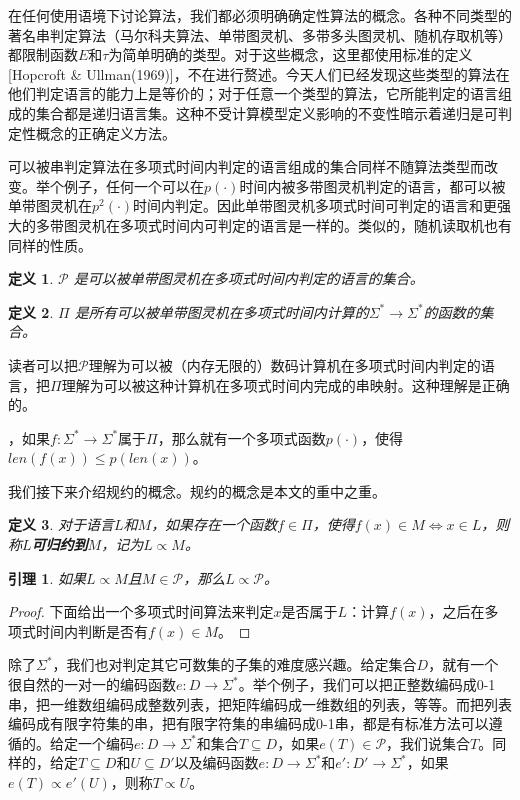\documentclass[twocolumn]{article}
\newtheorem{definition}{\hspace{2em}定义}
\newtheorem{lemma}{\hspace{2em}引理}
\theoremstyle{nonumberplain}%
\newtheorem{proof}{\hspace{2em}证明}
\begin{document}
\begin{CJK}{UTF8}{gbsn}
    在任何使用语境下讨论算法，我们都必须明确确定性算法的概念。各种不同类型的著名串判定算法（马尔科夫算法、单带图灵机、多带多头图灵机、随机存取机等）都限制函数$E$和$\tau$为简单明确的类型。对于这些概念，这里都使用标准的定义[Hopcroft \& Ullman(1969)]，不在进行赘述。今天人们已经发现这些类型的算法在他们判定语言的能力上是等价的；对于任意一个类型的算法，它所能判定的语言组成的集合都是递归语言集。这种不受计算模型定义影响的不变性暗示着递归是可判定性概念的正确定义方法。

    可以被串判定算法在多项式时间内判定的语言组成的集合同样不随算法类型而改变。举个例子，任何一个可以在$p(\cdot)$时间内被多带图灵机判定的语言，都可以被单带图灵机在$p^2(\cdot)$时间内判定。因此单带图灵机多项式时间可判定的语言和更强大的多带图灵机在多项式时间内可判定的语言是一样的。类似的，随机读取机也有同样的性质。
    \begin{definition}
        $\mathcal{P}$ 是可以被单带图灵机在多项式时间内判定的语言的集合。
    \end{definition}
    \begin{definition}
        $\Pi$ 是所有可以被单带图灵机在多项式时间内计算的$\Sigma^*\to\Sigma^*$的函数的集合。
    \end{definition}

    读者可以把$\mathcal{P}$理解为可以被（内存无限的）数码计算机在多项式时间内判定的语言，把$\Pi$理解为可以被这种计算机在多项式时间内完成的串映射。这种理解是正确的。

    {}，如果$f:\Sigma^*\to\Sigma^*$属于$\Pi$，那么就有一个多项式函数$p(\cdot)$，使得$len(f(x))\le p(len(x))$。

    我们接下来介绍规约的概念。规约的概念是本文的重中之重。
    \begin{definition}
        对于语言$L$和$M$，如果存在一个函数$f\in\Pi$，使得$f(x)\in M \Leftrightarrow x\in L$，则称$L${\bf 可归约到}$M$，记为$L\propto M$。
    \end{definition}

    \begin{lemma}
        如果$L\propto M$且$M \in \mathcal{P}$，那么$L\propto\mathcal{P}$。
    \end{lemma}
    \begin{proof}
        下面给出一个多项式时间算法来判定$x$是否属于$L$：计算$f(x)$，之后在多项式时间内判断是否有$f(x)\in M$。
    \end{proof}

    除了$\Sigma^*$，我们也对判定其它可数集的子集的难度感兴趣。给定集合$D$，就有一个很自然的一对一的编码函数$e:D\to\Sigma^*$。举个例子，我们可以把正整数编码成0-1串，把一维数组编码成整数列表，把矩阵编码成一维数组的列表，等等。而把列表编码成有限字符集的串，把有限字符集的串编码成0-1串，都是有标准方法可以遵循的。给定一个编码$e:D\to\Sigma^*$和集合$T\subseteq D$，如果$e(T)\in\mathcal{P}$，我们说集合$T${}。同样的，给定$T\subseteq D$和$U\subseteq D'$以及编码函数$e:D\to\Sigma^*$和$e':D'\to\Sigma^*$，如果$e(T)\propto e'(U)$，则称$T\propto U$。


\end{CJK}
\end{document}
